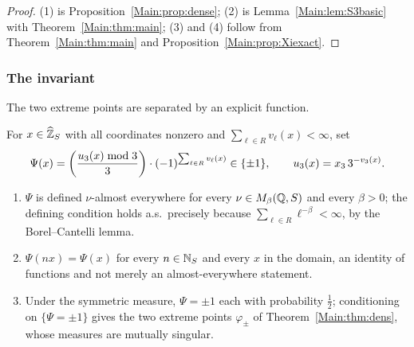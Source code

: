 \begin{proof}
(1) is Proposition~\ref{Main:prop:dense}; (2) is Lemma~\ref{Main:lem:S3basic} with
Theorem~\ref{Main:thm:main}; (3) and (4) follow from Theorem~\ref{Main:thm:main} and
Proposition~\ref{Main:prop:Xiexact}.
\end{proof}

\subsubsection*{The invariant}

The two extreme points are separated by an explicit function.

\begin{definition}\label{Main:def:Psi}
For $x\in\widehat{\mathbb{Z}}_S$ with all coordinates nonzero and $\sum_{\ell\in R}v_\ell(x)<\infty$,
set
\begin{equation}\label{Main:eq:Psi}
\Psi(x)=\left(\frac{u_3(x)\bmod3}{3}\right)\cdot(-1)^{\sum_{\ell\in R}v_\ell(x)}\in\{\pm1\},
\qquad u_3(x)=x_3\,3^{-v_3(x)} .
\end{equation}
\end{definition}

\begin{proposition}\label{Main:prop:Psi}
\begin{enumerate}
\item $\Psi$ is defined $\nu$-almost everywhere for every $\nu\in M_\beta(\mathbb{Q},S)$
and every $\beta>0$; the defining condition holds a.s.\ precisely because
$\sum_{\ell\in R}\ell^{-\beta}<\infty$, by the Borel--Cantelli lemma.
\item $\Psi(nx)=\Psi(x)$ for every $n\in\mathbb{N}_S$ and every $x$ in the domain, an
identity of functions and not merely an almost-everywhere statement.
\item Under the symmetric measure, $\Psi=\pm1$ each with probability $\tfrac12$;
conditioning on $\{\Psi=\pm1\}$ gives the two extreme points $\varphi_\pm$ of
Theorem~\ref{Main:thm:dens}, whose measures are mutually singular.
\end{enumerate}
\end{proposition}

